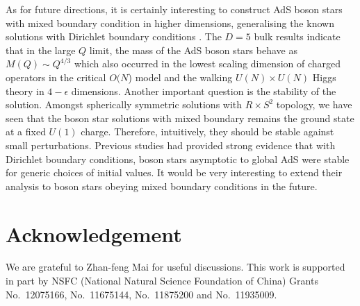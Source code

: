 \documentclass[11pt]{article}
\begin{document}
As for future directions, it is certainly interesting to construct AdS boson stars with mixed boundary condition in higher dimensions, generalising the known solutions with Dirichlet boundary conditions  \cite{Basu:2010uz,Bhattacharyya:2010yg,Dias:2011tj}. The $D=5$ bulk results \cite{Basu:2010uz,Bhattacharyya:2010yg,Dias:2011tj} indicate that in the large $Q$ limit,
the mass of the AdS boson stars behave as $M(Q)\sim Q^{4/3}$ which also occurred in the lowest scaling dimension 
of charged operators in the critical $O(N$) model \cite{Antipin:2020abu} and  the walking $U(N)\times U(N)$ Higgs theory \cite{Antipin:2020rdw} in $4-\epsilon$ dimensions.
 Another important question is the stability of the solution. Amongst spherically symmetric solutions with $R\times S^2$ topology, we have seen that the boson star solutions with mixed boundary remains the ground state at a fixed $U(1)$ charge. Therefore, intuitively, they should be stable  against small perturbations. Previous studies \cite{Buchel:2013uba, Dias:2012tq} had provided strong evidence that   with Dirichlet boundary conditions, boson stars asymptotic to global AdS were stable for generic choices of initial values. It would be very interesting to extend their analysis to boson stars obeying mixed boundary conditions in the future.



\section*{Acknowledgement}

We are grateful to Zhan-feng Mai for useful discussions. This work is supported in part by NSFC (National Natural Science Foundation of China) Grants No.~12075166, No.~11675144, No.~11875200 and No.~11935009.
\end{document}

